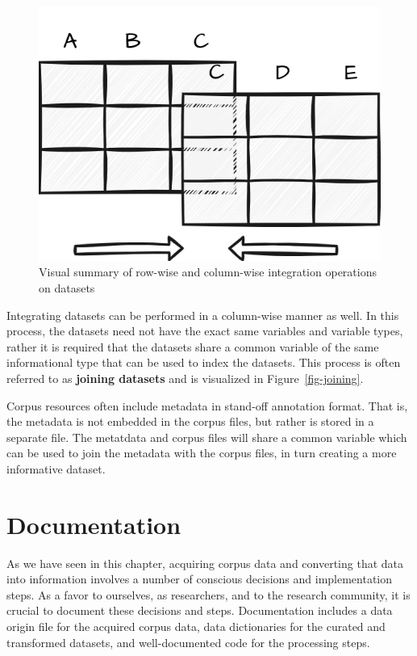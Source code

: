 \documentclass[
  letterpaper,
]{latex/krantz}
\theoremstyle{definition}
\theoremstyle{remark}
\begin{document}
\begin{figure}[!htb]
\begin{minipage}{0.55\linewidth}
{\includegraphics{part_2/figures/integration-join-visual.drawio.png}

}


\end{minipage}%

\caption{\label{fig-data-integration}Visual summary of row-wise and
column-wise integration operations on datasets}

\end{figure}%

Integrating datasets can be performed in a column-wise manner as well.
In this process, the datasets need not have the exact same variables and
variable types, rather it is required that the datasets share a common
variable of the same informational type that can be used to index the
datasets. This process is often referred to as \textbf{joining datasets}
and is visualized in Figure~\ref{fig-joining}.

Corpus resources often include metadata in stand-off annotation format.
That is, the metadata is not embedded in the corpus files, but rather is
stored in a separate file. The metatdata and corpus files will share a
common variable which can be used to join the metadata with the corpus
files, in turn creating a more informative dataset.

\section{Documentation}\label{sec-data-documentation}

As we have seen in this chapter, acquiring corpus data and converting
that data into information involves a number of conscious decisions and
implementation steps. As a favor to ourselves, as researchers, and to
the research community, it is crucial to document these decisions and
steps. Documentation includes a data origin file for the acquired corpus
data, data dictionaries for the curated and transformed datasets, and
well-documented code for the processing steps.
\end{document}
